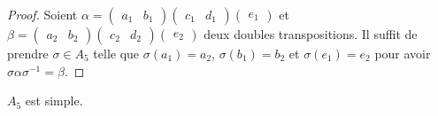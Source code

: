   \begin{proof}
    Soient $\alpha = \begin{pmatrix} a_1 & b_1 \end{pmatrix} \begin{pmatrix} c_1 & d_1 \end{pmatrix} \begin{pmatrix} e_1 \end{pmatrix}$ et $\beta = \begin{pmatrix} a_2 & b_2 \end{pmatrix} \begin{pmatrix} c_2 & d_2 \end{pmatrix} \begin{pmatrix} e_2 \end{pmatrix}$ deux doubles transpositions. Il suffit de prendre $\sigma \in A_5$ telle que $\sigma(a_1) = a_2$, $\sigma(b_1) = b_2$ et $\sigma(e_1) = e_2$ pour avoir $\sigma \alpha \sigma^{-1} = \beta$.
  \end{proof}

  \begin{lemma}
    \label{simplicite-du-groupe-alterne-4}
    $A_5$ est simple.
  \end{lemma}

